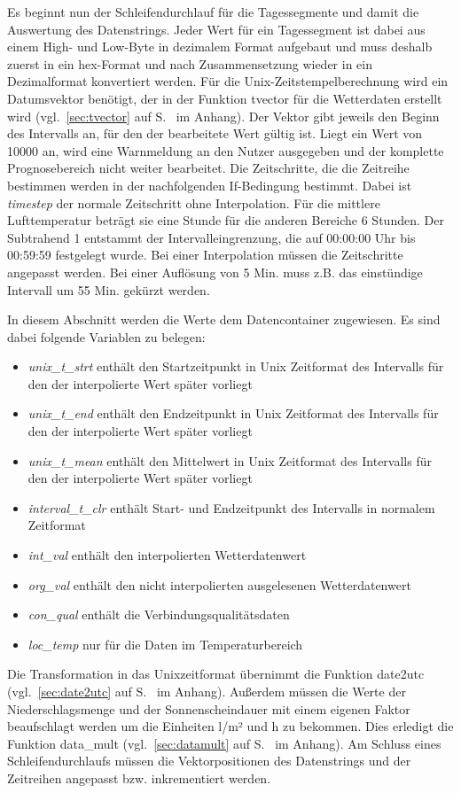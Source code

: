 Es beginnt nun der Schleifendurchlauf für die Tagessegmente und damit die Auswertung des Datenstrings. Jeder Wert für ein Tagessegment ist dabei aus einem High- und Low-Byte in dezimalem Format aufgebaut und muss deshalb zuerst in ein hex-Format und nach Zusammensetzung wieder in ein Dezimalformat konvertiert werden. Für die Unix-Zeitstempelberechnung wird ein Datumsvektor benötigt, der in der Funktion \textsf{tvector} für die Wetterdaten erstellt wird (vgl.~\ref{sec:tvector} auf S.~\pageref{sec:tvector} im Anhang). Der Vektor gibt jeweils den Beginn des Intervalls an, für den der bearbeitete Wert gültig ist. Liegt ein Wert von 10000 an, wird eine Warnmeldung an den Nutzer ausgegeben und der komplette Prognosebereich nicht weiter bearbeitet. Die Zeitschritte, die die Zeitreihe bestimmen werden in der nachfolgenden If-Bedingung bestimmt. Dabei ist \textit{timestep} der normale Zeitschritt ohne Interpolation. Für die mittlere Lufttemperatur beträgt sie eine Stunde für die anderen Bereiche 6 Stunden. Der Subtrahend 1 entstammt der Intervalleingrenzung, die auf 00:00:00 Uhr bis 00:59:59 festgelegt wurde. Bei einer Interpolation müssen die Zeitschritte angepasst werden. Bei einer Auflösung von 5 Min. muss z.B. das einstündige Intervall um 55 Min. gekürzt werden.
 
In diesem Abschnitt werden die Werte dem Datencontainer zugewiesen. Es sind dabei folgende Variablen zu belegen:
\begin{itemize}
\item \textit{unix\_t\_strt} enthält den Startzeitpunkt in Unix Zeitformat des Intervalls für den der interpolierte Wert später vorliegt
\item \textit{unix\_t\_end} enthält den Endzeitpunkt in Unix Zeitformat des Intervalls für den der interpolierte Wert später vorliegt
\item \textit{unix\_t\_mean} enthält den Mittelwert in Unix Zeitformat des Intervalls für den der interpolierte Wert später vorliegt
\item \textit{interval\_t\_clr} enthält Start- und Endzeitpunkt des Intervalls in normalem Zeitformat
\item \textit{int\_val} enthält den interpolierten Wetterdatenwert
\item \textit{org\_val} enthält den nicht interpolierten ausgelesenen Wetterdatenwert
\item \textit{con\_qual} enthält die Verbindungsqualitätsdaten
\item \textit{loc\_temp} nur für die Daten im Temperaturbereich   
\end{itemize}
Die Transformation in das Unixzeitformat übernimmt die Funktion \textsf{date2utc} (vgl.~\ref{sec:date2utc} auf S.~\pageref{sec:date2utc} im Anhang). Außerdem müssen die Werte der Niederschlagsmenge und der Sonnenscheindauer mit einem eigenen Faktor beaufschlagt werden um die Einheiten l/m² und h zu bekommen. Dies erledigt die Funktion \textsf{data\_mult} (vgl.~\ref{sec:datamult} auf S.~\pageref{sec:datamult} im Anhang).
Am Schluss eines Schleifendurchlaufs müssen die Vektorpositionen des Datenstrings und der Zeitreihen angepasst bzw. inkrementiert werden. 

